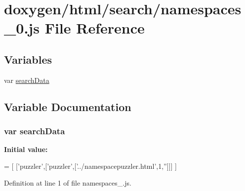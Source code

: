 \hypertarget{a00099}{}\section{doxygen/html/search/namespaces\+\_\+0.js File Reference}
\label{a00099}
\subsection*{Variables}
\begin{DoxyCompactItemize}
\item 
var \hyperlink{a00099_ad01a7523f103d6242ef9b0451861231e}{search\+Data}
\end{DoxyCompactItemize}


\subsection{Variable Documentation}
\hypertarget{a00099_ad01a7523f103d6242ef9b0451861231e}{}
\subsubsection[{search\+Data}]{\setlength{\rightskip}{0pt plus 5cm}var search\+Data}\label{a00099_ad01a7523f103d6242ef9b0451861231e}
{\bfseries Initial value\+:}
\begin{DoxyCode}
=
[
  [\textcolor{stringliteral}{'puzzler'},[\textcolor{stringliteral}{'puzzler'},[\textcolor{stringliteral}{'../namespacepuzzler.html'},1,\textcolor{stringliteral}{''}]]]
]
\end{DoxyCode}


Definition at line 1 of file namespaces\+\_.\+js.


